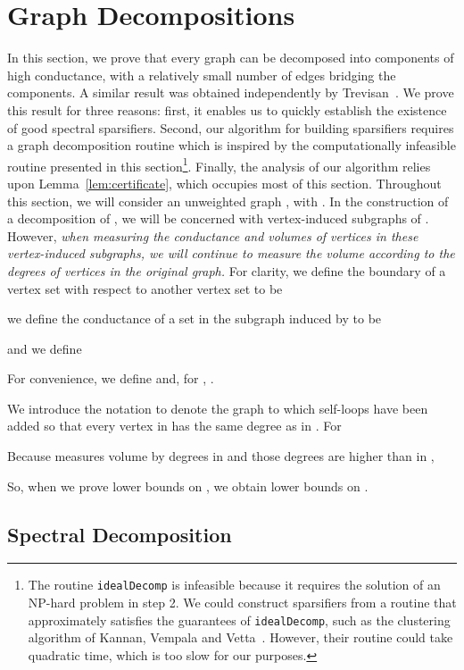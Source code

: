 \documentclass[11pt]{article}
\begin{document}
\section{Graph Decompositions}\label{sec:decomp}
In this section, we prove
  that every graph can be decomposed into components of high conductance,
  with a relatively small number of edges bridging the components.
A similar result was obtained independently by Trevisan~\cite{Trevisan}.
We prove this result for three reasons: first, it enables us to quickly establish
  the existence of good spectral sparsifiers.
Second, our algorithm for building sparsifiers requires a graph
  decomposition routine which is inspired by the computationally
  infeasible routine presented in this section\footnote{The routine \texttt{idealDecomp} is infeasible because it requires
  the solution of an NP-hard problem in step 2.
We could construct sparsifiers from a routine that approximately satisfies
  the guarantees of \texttt{idealDecomp}, such as the clustering algorithm of
  Kannan, Vempala and Vetta~\cite{KannanVempalaVetta}.
However, their routine could take  quadratic time, which is too slow
  for our purposes.
}.
Finally, the analysis of our algorithm relies upon Lemma~\ref{lem:certificate}, which
  occupies most of this section.
Throughout this section, we will consider an unweighted graph ,
  with .
In the construction  of a decomposition of , we will be concerned with
  vertex-induced subgraphs of .
However, \textit{when measuring the conductance and volumes of vertices in
  these vertex-induced subgraphs, we will continue to measure the
  volume according to the degrees of vertices in the original graph.}
For clarity, 
  we define the boundary of a vertex set  with respect to another
  vertex set  to be

we define the conductance of a set  in the subgraph induced
  by  to be

and we define

For convenience, we define  and, for ,
  .

We introduce the notation  to denote the graph  to which self-loops
  have been added so that every vertex in  has the same degree as in .
For 

Because  measures volume by degrees in 
  and those degrees are higher than in ,

So, when we prove lower bounds on , we obtain lower
  bounds on .

\subsection{Spectral Decomposition}
\end{document}
